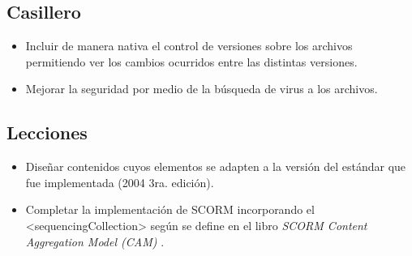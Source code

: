 \subsection*{Casillero}
\begin{itemize}
	\item Incluir de manera nativa el control de versiones sobre los archivos permitiendo ver los cambios ocurridos entre las distintas versiones.
	\item Mejorar la seguridad por medio de la búsqueda de virus a los archivos.
\end{itemize}

\subsection*{Lecciones}
\begin{itemize}
	\item Diseñar contenidos cuyos elementos se adapten a la versión del estándar que fue implementada (2004 3ra. edición).
	\item Completar la implementación de SCORM incorporando el <sequencingCollection> según se define en el libro \emph{SCORM Content Aggregation Model (CAM)} \citep{SCORM_CAM}.
\end{itemize}
